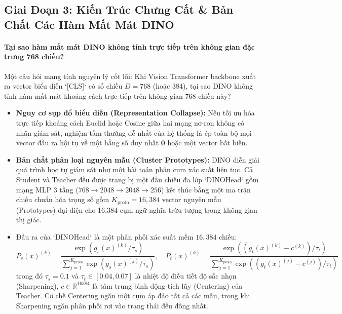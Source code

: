 \documentclass[11pt,a4paper]{article}
\begin{document}
\subsection{Giai Đoạn 3: Kiến Trúc Chưng Cất \& Bản Chất Các Hàm Mất Mát DINO}

\paragraph{Tại sao hàm mất mát DINO không tính trực tiếp trên không gian đặc trưng 768 chiều?}
Một câu hỏi mang tính nguyên lý cốt lõi: Khi Vision Transformer backbone xuất ra vector biểu diễn `[CLS]` có số chiều $D = 768$ (hoặc $384$), tại sao DINO không tính hàm mất mát khoảng cách trực tiếp trên không gian 768 chiều này?
\begin{itemize}
    \item \textbf{Nguy cơ sụp đổ biểu diễn (Representation Collapse):} Nếu tối ưu hóa trực tiếp khoảng cách Euclid hoặc Cosine giữa hai mạng nơ-ron không có nhãn giám sát, nghiệm tầm thường dễ nhất của hệ thống là ép toàn bộ mọi vector đầu ra hội tụ về một hằng số duy nhất $\mathbf{0}$ hoặc một vector bất biến.
    \item \textbf{Bản chất phân loại nguyên mẫu (Cluster Prototypes):} DINO diễn giải quá trình học tự giám sát như một bài toán phân cụm xác suất liên tục. Cả Student và Teacher đều được trang bị một đầu chiếu đa lớp `DINOHead` gồm mạng MLP 3 tầng ($768 \to 2048 \to 2048 \to 256$) kết thúc bằng một ma trận chiếu chuẩn hóa trọng số gồm $K_{\text{proto}} = 16,384$ vector nguyên mẫu (Prototypes) đại diện cho 16,384 cụm ngữ nghĩa trừu tượng trong không gian thị giác.
    \item Đầu ra của `DINOHead` là một phân phối xác suất mềm $16,384$ chiều:
    \begin{equation}
        P_s(x)^{(k)} = \frac{\exp\left(g_s(x)^{(k)} / \tau_s\right)}{\sum_{j=1}^{K_{\text{proto}}} \exp\left(g_s(x)^{(j)} / \tau_s\right)}, \quad P_t(x)^{(k)} = \frac{\exp\left((g_t(x)^{(k)} - c^{(k)}) / \tau_t\right)}{\sum_{j=1}^{K_{\text{proto}}} \exp\left((g_t(x)^{(j)} - c^{(j)}) / \tau_t\right)}
    \end{equation}
    trong đó $\tau_s = 0.1$ và $\tau_t \in [0.04, 0.07]$ là nhiệt độ điều tiết độ sắc nhọn (Sharpening), $c \in \mathbb{R}^{16384}$ là tâm trung bình động tích lũy (Centering) của Teacher. Cơ chế Centering ngăn một cụm áp đảo tất cả các mẫu, trong khi Sharpening ngăn phân phối rơi vào trạng thái đều đồng nhất.
\end{itemize}
\end{document}
